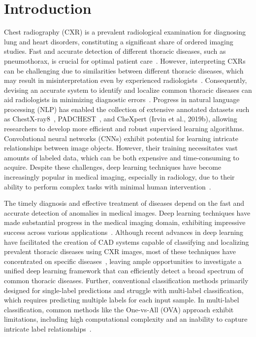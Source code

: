 \section{Introduction}

Chest radiography (CXR) is a prevalent radiological examination for diagnosing lung and heart disorders, constituting a significant share of ordered imaging studies. Fast and accurate detection of different thoracic diseases, such as pneumothorax, is crucial for optimal patient care~\cite{bellaviti_Increased_2016}. However, interpreting CXRs can be challenging due to similarities between different thoracic diseases, which may result in misinterpretation even by experienced radiologists~\cite{delrue_Difficulties_2011}. Consequently, devising an accurate system to identify and localize common thoracic diseases can aid radiologists in minimizing diagnostic errors~\cite{crisp_Global_2014,silverstein_Most_2016}.
Progress in natural language processing (NLP) has enabled the collection of extensive annotated datasets such as ChestX-ray8~\cite{wang_ChestXRay8_2017}, PADCHEST~\cite{bustos_Padchest_2020}, and CheXpert (Irvin et al., 2019b), allowing researchers to develop more efficient and robust supervised learning algorithms.
Convolutional neural networks (CNNs) exhibit potential for learning intricate relationships between image objects. However, their training necessitates vast amounts of labeled data, which can be both expensive and time-consuming to acquire. Despite these challenges, deep learning techniques have become increasingly popular in medical imaging, especially in radiology, due to their ability to perform complex tasks with minimal human intervention~\cite{jaderberg_Spatial_2015}.

The timely diagnosis and effective treatment of diseases depend on the fast and accurate detection of anomalies in medical images. Deep learning techniques have made substantial progress in the medical imaging domain, exhibiting impressive success across various applications~\cite{litjens_Survey_2017a,eshghali_Machine_2023}.  Although recent advances in deep learning have facilitated the creation of CAD systems capable of classifying and localizing prevalent thoracic diseases using CXR images, most of these techniques have concentrated on specific diseases~\cite{jaiswal_Identifying_2019,lakhani_Deep_2017,pasa_Efficient_2019,ausawalaithong_Automatic_2018}, leaving ample opportunities to investigate a unified deep learning framework that can efficiently detect a broad spectrum of common thoracic diseases. Further, conventional classification methods primarily designed for single-label predictions and struggle with multi-label classification, which requires predicting multiple labels for each input sample. In multi-label classification, common methods like the One-vs-All (OVA) approach exhibit limitations, including high computational complexity and an inability to capture intricate label relationships~\cite{tsoumakas_MultiLabel_2007}.

